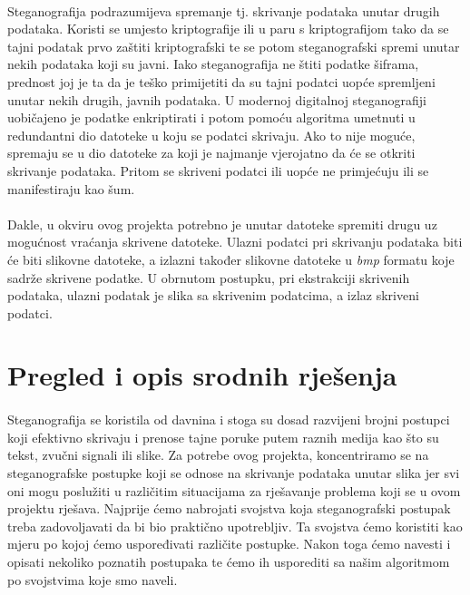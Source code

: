 \documentclass[times, utf8, seminar]{fer}
\begin{document}
\paragraph{}
Steganografija podrazumijeva spremanje tj. skrivanje podataka unutar drugih podataka. Koristi se umjesto kriptografije ili u paru s kriptografijom tako da se tajni podatak prvo zaštiti kriptografski te se potom steganografski spremi unutar nekih podataka koji su javni. Iako steganografija ne štiti podatke šiframa, prednost joj je ta da je teško primijetiti da su tajni podatci uopće spremljeni unutar nekih drugih, javnih podataka. U modernoj digitalnoj steganografiji uobičajeno je podatke enkriptirati i potom pomoću algoritma umetnuti u redundantni dio datoteke u koju se podatci skrivaju. Ako to nije moguće, spremaju se u dio datoteke za koji je najmanje vjerojatno da će se otkriti skrivanje podataka. Pritom se skriveni podatci ili uopće ne primjećuju ili se manifestiraju kao šum. 
\paragraph{}
Dakle, u okviru ovog projekta potrebno je unutar datoteke spremiti drugu uz mogućnost vraćanja skrivene datoteke. Ulazni podatci pri skrivanju podataka biti će biti slikovne datoteke, a izlazni također slikovne datoteke u \textit{bmp} formatu koje sadrže skrivene podatke. U obrnutom postupku, pri ekstrakciji skrivenih podataka, ulazni podatak je slika sa skrivenim podatcima, a izlaz skriveni podatci. 
\section{Pregled i opis srodnih rješenja}

\paragraph{}
Steganografija se koristila od davnina i stoga su dosad razvijeni brojni postupci koji efektivno skrivaju i prenose tajne poruke putem raznih medija kao što su tekst, zvučni signali ili slike. Za potrebe ovog projekta, koncentriramo se na steganografske postupke koji se odnose na skrivanje podataka unutar slika jer svi oni mogu poslužiti u različitim situacijama za rješavanje problema koji se u ovom projektu rješava. Najprije ćemo nabrojati svojstva koja steganografski postupak treba zadovoljavati da bi bio praktično upotrebljiv. Ta svojstva ćemo koristiti kao mjeru po kojoj ćemo uspoređivati različite postupke. Nakon toga ćemo navesti i opisati nekoliko poznatih postupaka te ćemo ih usporediti sa našim algoritmom po svojstvima koje smo naveli.
\end{document}
